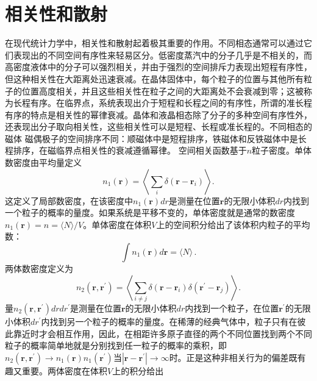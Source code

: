 \section{相关性和散射}\label{ux76f8ux5173ux6027ux548cux6563ux5c04}
在现代统计力学中，相关性和散射起着极其重要的作用。不同相态通常可以通过它们表现出的不同空间有序性来轻易区分。低密度蒸汽中的分子几乎是不相关的，而高密度液体中的分子可以强烈相关，并由于强烈的空间排斥力表现出短程有序性，但这种相关性在大距离处迅速衰减。在晶体固体中，每个粒子的位置与其他所有粒子的位置高度相关，并且这些相关性在粒子之间的大距离处不会衰减到零；这被称为长程有序。在临界点，系统表现出介于短程和长程之间的有序性，所谓的准长程有序的特点是相关性的幂律衰减。晶体和液晶相态除了分子的多种空间有序性外，还表现出分子取向相关性，这些相关性可以是短程、长程或准长程的。不同相态的磁体
磁偶极子的空间排序不同：顺磁体中是短程排序，铁磁体和反铁磁体中是长程排序，在磁临界点相关性的衰减遵循幂律。
空间相关函数基于\(n\)粒子密度。单体数密度由平均量定义
\begin{equation}\tag{10.7.1}\label{eq:10.7.1}
n _ { 1 } ( \boldsymbol { r } ) = \left\langle \sum _ { i } \delta ( \boldsymbol { r } - \boldsymbol { r } _ { i } ) \right\rangle .
\end{equation}
这定义了局部数密度，在该密度中\(n_{1}(\boldsymbol{r})dr\)是测量在位置\(\boldsymbol{r}\)的无限小体积\(dr\)内找到一个粒子的概率的量度。如果系统是平移不变的，单体密度就是通常的数密度\(n_{1}(\boldsymbol{r})=n=\langle N\rangle/V\)。单体密度在体积\(V\)上的空间积分给出了该体积内粒子的平均数：
\begin{equation}\tag{10.7.2}\label{eq:10.7.2}
\int n _ { 1 } ( \pmb { r } ) d \pmb { r } = \langle N \rangle \, .
\end{equation}
两体数密度定义为
\begin{equation}\tag{10.7.3}\label{eq:10.7.3}
n _ { 2 } ( \pmb { r } , \pmb { r } ^{\prime} ) = \left\langle \sum _ { i \neq j } \delta ( \pmb { r } - \pmb { r } _ { i } ) \delta ( \pmb { r } ^{\prime} - \pmb { r } _ { j } ) \right\rangle .
\end{equation}
量\(n_{2}(\boldsymbol{r},\boldsymbol{r}^{\prime})drdr^{\prime}\)是测量在位置\(\boldsymbol{r}\)的无限小体积\(dr\)内找到一个粒子，在位置\(\boldsymbol{r}^{\prime}\)的无限小体积\(dr^{\prime}\)内找到另一个粒子的概率的量度。在稀薄的经典气体中，粒子只有在彼此靠近时才会相互作用，因此，在相距许多原子直径的两个不同位置找到两个不同粒子的概率简单地就是分别找到任一粒子的概率的乘积，即\(n_{2}(\boldsymbol{r},\boldsymbol{r}^{\prime})\rightarrow n_{1}(\boldsymbol{r})n_{1}(\boldsymbol{r}^{\prime})\)当\(|\boldsymbol{r}-\boldsymbol{r}^{\prime}|\rightarrow\infty\)时。正是这种非相关行为的偏差既有趣又重要。两体密度在体积\(V\)上的积分给出
